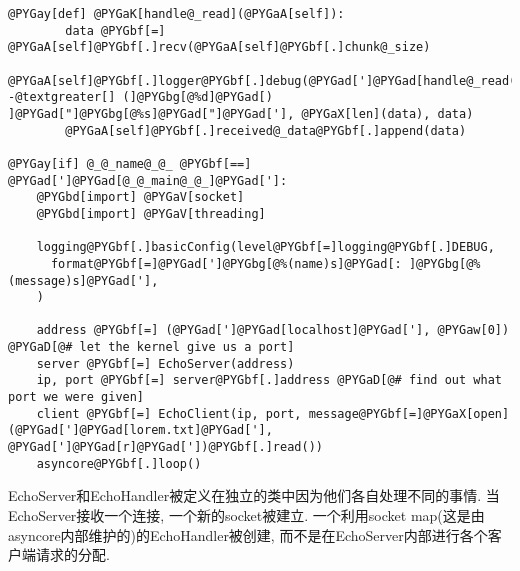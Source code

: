 \documentclass[a4paper,10pt,english]{manual}
\begin{document}
\begin{Verbatim}[commandchars=@\[\]]
    @PYGay[def] @PYGaK[handle@_read](@PYGaA[self]):
        data @PYGbf[=] @PYGaA[self]@PYGbf[.]recv(@PYGaA[self]@PYGbf[.]chunk@_size)
        @PYGaA[self]@PYGbf[.]logger@PYGbf[.]debug(@PYGad[']@PYGad[handle@_read() -@textgreater[] (]@PYGbg[@%d]@PYGad[) ]@PYGad["]@PYGbg[@%s]@PYGad["]@PYGad['], @PYGaX[len](data), data)
        @PYGaA[self]@PYGbf[.]received@_data@PYGbf[.]append(data)

@PYGay[if] @_@_name@_@_ @PYGbf[==] @PYGad[']@PYGad[@_@_main@_@_]@PYGad[']:
    @PYGbd[import] @PYGaV[socket]
    @PYGbd[import] @PYGaV[threading]

    logging@PYGbf[.]basicConfig(level@PYGbf[=]logging@PYGbf[.]DEBUG,
      format@PYGbf[=]@PYGad[']@PYGbg[@%(name)s]@PYGad[: ]@PYGbg[@%(message)s]@PYGad['],
    )

    address @PYGbf[=] (@PYGad[']@PYGad[localhost]@PYGad['], @PYGaw[0]) @PYGaD[@# let the kernel give us a port]
    server @PYGbf[=] EchoServer(address)
    ip, port @PYGbf[=] server@PYGbf[.]address @PYGaD[@# find out what port we were given]
    client @PYGbf[=] EchoClient(ip, port, message@PYGbf[=]@PYGaX[open](@PYGad[']@PYGad[lorem.txt]@PYGad['], @PYGad[']@PYGad[r]@PYGad['])@PYGbf[.]read())
    asyncore@PYGbf[.]loop()
\end{Verbatim}

EchoServer和EchoHandler被定义在独立的类中因为他们各自处理不同的事情. 当EchoServer接收一个连接, 一个新的socket被建立. 一个利用socket map(这是由asyncore内部维护的)的EchoHandler被创建, 而不是在EchoServer内部进行各个客户端请求的分配.
\end{document}
